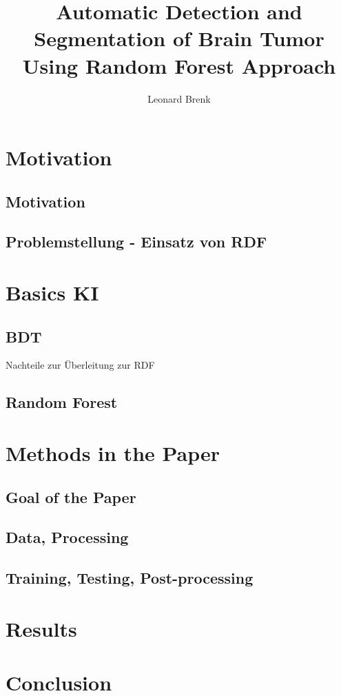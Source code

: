 \documentclass{article}
\title{Automatic Detection and Segmentation of Brain Tumor Using Random Forest Approach}
\author{Leonard Brenk}
\begin{document}
\maketitle
\newpage
\tableofcontents

\newpage

    \section{Motivation}
        \subsection{Motivation}

        

        \subsection{Problemstellung - Einsatz von RDF}
    \section{Basics KI}
        \subsection{BDT}
        Nachteile zur Überleitung zur RDF
        \subsection{Random Forest}
    \section{Methods in the Paper}
        \subsection{Goal of the Paper}
        \subsection{Data, Processing}
        \subsection{Training, Testing, Post-processing}
    \section{Results}
    \section{Conclusion}
\end{document}
